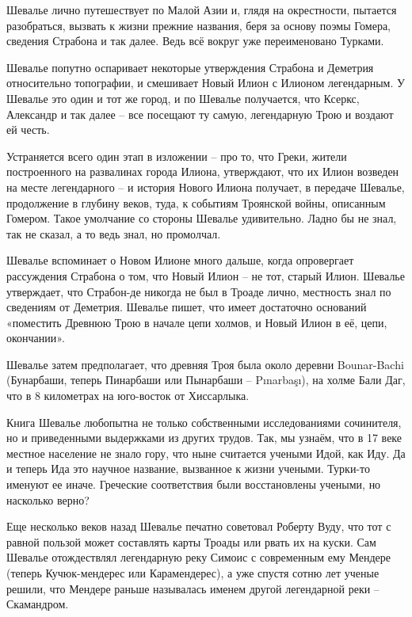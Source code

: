 Шевалье лично путешествует по Малой Азии и, глядя на окрестности, пытается разобраться, вызвать к жизни прежние названия, беря за основу поэмы Гомера, сведения Страбона и так далее. Ведь всё вокруг уже переименовано Турками.

Шевалье попутно оспаривает некоторые утверждения Страбона и Деметрия относительно топографии, и смешивает Новый Илион с Илионом легендарным. У Шевалье это один и тот же город, и по Шевалье получается, что Ксеркс, Александр и так далее – все посещают ту самую, легендарную Трою и воздают ей честь. 

Устраняется всего один этап в изложении – про то, что Греки, жители построенного на развалинах города Илиона, утверждают, что их Илион возведен на месте легендарного – и история Нового Илиона получает, в передаче Шевалье, продолжение в глубину веков, туда, к событиям Троянской войны, описанным Гомером. Такое умолчание со стороны Шевалье удивительно. Ладно бы не знал, так не сказал, а то ведь знал, но промолчал. 


Шевалье вспоминает о Новом Илионе много дальше, когда опровергает рассуждения Страбона о том, что Новый Илион – не тот, старый Илион. Шевалье утверждает, что Страбон-де никогда не был в Троаде лично, местность знал по сведениям от Деметрия. Шевалье пишет, что имеет достаточно оснований «поместить Древнюю Трою в начале цепи холмов, и Новый Илион в её, цепи, окончании».

Шевалье затем предполагает, что древняя Троя была около деревни Bounar-Bachi (Бунарбаши, теперь Пинарбаши или Пынарбаши – Pınarbaşı), на холме Бали Даг, что в 8 километрах на юго-восток от Хиссарлыка. 

Книга Шевалье любопытна не только собственными исследованиями сочинителя, но и приведенными выдержками из других трудов. Так, мы узнаём, что в 17 веке местное население не знало гору, что ныне считается учеными Идой, как Иду. Да и теперь Ида это научное название, вызванное к жизни учеными. Турки-то именуют ее иначе. Греческие соответствия были восстановлены учеными, но насколько верно?

Еще несколько веков назад Шевалье печатно советовал Роберту Вуду, что тот с равной пользой может составлять  карты Троады или рвать их на куски. Сам Шевалье отождествлял легендарную реку Симоис с современным ему Мендере (теперь Кучюк-мендерес или Карамендерес), а уже спустя сотню лет ученые решили, что Мендере раньше называлась именем другой легендарной реки – Скамандром.

